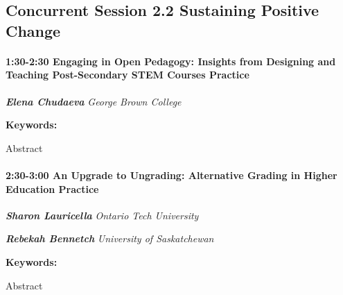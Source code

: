 \documentclass[
]{book}
\begin{document}
\hypertarget{concurrent-session-2.2-sustaining-positive-change}{%
\subsection*{Concurrent Session 2.2 \textbar{} Sustaining Positive Change}\label{concurrent-session-2.2-sustaining-positive-change}}

\begin{session}
\hypertarget{engaging-in-open-pedagogy-insights-from-designing-and-teaching-post-secondary-stem-courses-practice}{%
\paragraph*{\texorpdfstring{1:30-2:30 \textbar{} \textbf{Engaging in
Open Pedagogy: Insights from Designing and Teaching Post-Secondary STEM
Courses} \textbar{}
Practice}{1:30-2:30 \textbar{} Engaging in Open Pedagogy: Insights from Designing and Teaching Post-Secondary STEM Courses \textbar{} Practice}}\label{engaging-in-open-pedagogy-insights-from-designing-and-teaching-post-secondary-stem-courses-practice}}

\textbf{\emph{Elena Chudaeva}} \textbar{} \emph{George Brown College}

\textbf{Keywords:}

Abstract
\end{session}

\begin{session}
\hypertarget{an-upgrade-to-ungrading-alternative-grading-in-higher-education-practice}{%
\paragraph*{\texorpdfstring{2:30-3:00 \textbar{} \textbf{An Upgrade to
Ungrading: Alternative Grading in Higher Education} \textbar{}
Practice}{2:30-3:00 \textbar{} An Upgrade to Ungrading: Alternative Grading in Higher Education \textbar{} Practice}}\label{an-upgrade-to-ungrading-alternative-grading-in-higher-education-practice}}

\textbf{\emph{Sharon Lauricella}} \textbar{} \emph{Ontario Tech
University}

\textbf{\emph{Rebekah Bennetch}} \textbar{} \emph{University of
Saskatchewan}

\textbf{Keywords:}

Abstract
\end{session}
\end{document}

